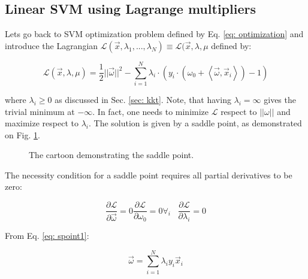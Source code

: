 \subsection{Linear SVM using Lagrange multipliers}
\label{sec: svmLinearLM}

Lets go back to SVM optimization problem defined by Eq. \ref{eq: optimization} and introduce the Lagrangian $\mathcal{L} (\vec x, \lambda_1, ..., \lambda_N) \equiv \mathcal{L} (\vec x, \lambda, \mu$ defined by:

\begin{equation} 
  \mathcal{L} (\vec x, \lambda, \mu) = \frac{1}{2}||\vec\omega||^2 - \sum_{i=1}^N \lambda_i \cdot \left(y_i \cdot \left(\omega_0 + \left<\vec\omega, \vec x_i\right>\right) - 1\right)
  \label{eq: svmL}
\end{equation}

where $\lambda_i \geq 0$ as discussed in Sec. \ref{sec: kkt}. Note, that having $\lambda_i = \infty$ gives the trivial minimum at $-\infty$. In fact, one needs to minimize $\mathcal{L}$ respect to $||\omega||$ and maximize respect to $\lambda_i$. The solution is given by a saddle point, as demonstrated on Fig. \ref{fig: spoint}.

\begin{figure}
 \centering
 \caption{The cartoon demonstrating the saddle point.}
 \label{fig: spoint}
\end{figure}

The necessity condition for a saddle point requires all partial derivatives to be zero:

\begin{subequations}
 \begin{equation}
  \frac{\partial\mathcal{L}}{\partial\vec\omega} = 0
  \label{eq: spoint1}
 \end{equation}
 \begin{equation}
  \frac{\partial\mathcal{L}}{\partial\omega_0} = 0
  \label{eq: spoint2}
 \end{equation}
 \begin{equation}
  \forall_i \hspace{10pt} \frac{\partial\mathcal{L}}{\partial\lambda_i} = 0
  \label{eq: spoint3}
 \end{equation}
 \label{eq: spoint}
\end{subequations}

From Eq. \ref{eq: spoint1}:

\begin{equation}
 \vec\omega = \sum_{i=1}^N \lambda_iy_i\vec x_i
 \label{eq: from1}
\end{equation}

